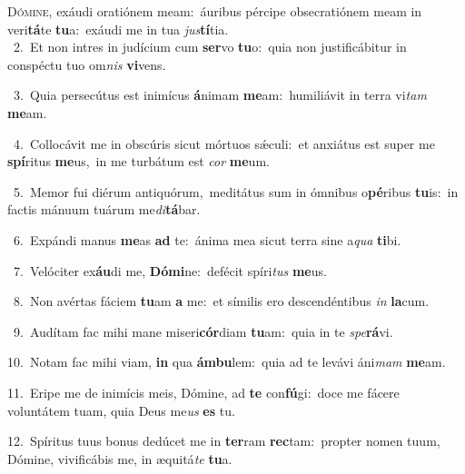 \lettrine{\initial\textcolor{\initialcolor}{D}}{ómine,} exáudi oratiónem meam:~\dagger áuribus pércipe obsecratiónem meam in veri\-\textbf{tá}\-te \textbf{tu}\-a:~\star exáudi me in tua \textit{jus}\-\textbf{tí}tia.\\
{\numbfont\textcolor{\numbcolor}{~2.}}~Et non intres in judícium cum \textbf{ser}\-vo \textbf{tu}\-o:~\star quia non justificábitur in conspéctu tuo om\textit{nis} \textbf{vi}\-vens.\par
{\numbfont\textcolor{\numbcolor}{~3.}}~Quia persecútus est inimícus \textbf{á}\-nimam \textbf{me}\-am:~\star humiliávit in terra vi\textit{tam} \textbf{me}\-am.\par
{\numbfont\textcolor{\numbcolor}{~4.}}~Collocávit me in obscúris sicut mórtuos sǽculi:~\dagger et anxiátus est super me \textbf{spí}\-ritus \textbf{me}\-us,~\star in me turbátum est \textit{cor} \textbf{me}\-um.\par
{\numbfont\textcolor{\numbcolor}{~5.}}~Memor fui diérum antiquórum,~\dagger meditátus sum in ómnibus o\-\textbf{pé}\-ribus \textbf{tu}\-is:~\star in factis mánuum tuárum me\-\textit{di}\-\textbf{tá}bar.\par
{\numbfont\textcolor{\numbcolor}{~6.}}~Expándi manus \textbf{me}\-as \textbf{ad} te:~\star ánima mea sicut terra sine a\textit{qua} \textbf{ti}\-bi.\par
{\numbfont\textcolor{\numbcolor}{~7.}}~Velóciter ex\-\textbf{áu}\-di me, \textbf{Dó}\-\textbf{mi}ne:~\star defécit spíri\textit{tus} \textbf{me}\-us.\par
{\numbfont\textcolor{\numbcolor}{~8.}}~Non avértas fáciem \textbf{tu}\-am \textbf{a} me:~\star et símilis ero descendéntibus \textit{in} \textbf{la}\-cum.\par
{\numbfont\textcolor{\numbcolor}{~9.}}~Audítam fac mihi mane miseri\-\textbf{cór}\-diam \textbf{tu}\-am:~\star quia in te \textit{spe}\-\textbf{rá}vi.\par
{\numbfont\textcolor{\numbcolor}{10.}}~Notam fac mihi viam, \textbf{in} qua \textbf{ám}\-\textbf{bu}lem:~\star quia ad te levávi áni\textit{mam} \textbf{me}\-am.\par
{\numbfont\textcolor{\numbcolor}{11.}}~Eripe me de inimícis meis, Dómine, ad \textbf{te} con\-\textbf{fú}\-gi:~\star doce me fácere voluntátem tuam, quia Deus me\textit{us} \textbf{es} tu.\par
{\numbfont\textcolor{\numbcolor}{12.}}~Spíritus tuus bonus dedúcet me in \textbf{ter}\-ram \textbf{rec}\-tam:~\star propter nomen tuum, Dómine, vivificábis me, in æquitá\textit{te} \textbf{tu}\-a.\par
